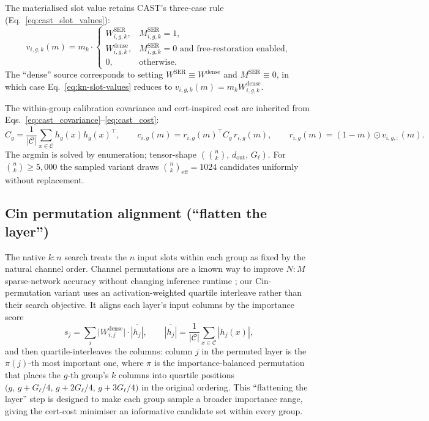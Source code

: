 \documentclass[11pt]{article}
\theoremstyle{plain}
\theoremstyle{definition}
\theoremstyle{remark}
\newcommand{\1}{\mathbf{1}}
\begin{document}
The materialised slot value retains CAST's three-case rule (Eq.~\ref{eq:cast_slot_values}):
\begin{equation}
\label{eq:kn-slot-values}
v_{i,g,k}(m) = m_k \cdot \begin{cases}
W^{\mathrm{SER}}_{i,g,k}, & M^{\mathrm{SER}}_{i,g,k} = 1, \\
W^{\mathrm{dense}}_{i,g,k}, & M^{\mathrm{SER}}_{i,g,k} = 0 \text{ and free-restoration enabled}, \\
0, & \text{otherwise}.
\end{cases}
\end{equation}
The ``dense'' source corresponds to setting $W^{\mathrm{SER}} \equiv W^{\mathrm{dense}}$ and $M^{\mathrm{SER}} \equiv 0$, in which case Eq.~\eqref{eq:kn-slot-values} reduces to $v_{i,g,k}(m) = m_k W^{\mathrm{dense}}_{i,g,k}$.

The within-group calibration covariance and cert-inspired cost are inherited from Eqs.~\ref{eq:cast_covariance}--\ref{eq:cast_cost}:
\begin{equation}
\label{eq:kn-cost}
C_g = \frac{1}{|\mathcal{C}|} \sum_{x \in \mathcal{C}} h_g(x) h_g(x)^\top,
\qquad
c_{i,g}(m) = r_{i,g}(m)^\top C_g\, r_{i,g}(m),
\qquad
r_{i,g}(m) = (1 - m) \odot v_{i,g,:}(m).
\end{equation}
The argmin is solved by enumeration; tensor-shape $(\binom{n}{k},\, d_{\mathrm{out}},\, G_\ell)$. For $\binom{n}{k}\ge 5{,}000$ the sampled variant draws $\binom{n}{k}_{\mathrm{eff}} = 1024$ candidates uniformly without replacement.

\subsection{Cin permutation alignment (``flatten the layer'')}
\label{subsec:perm}

The native $k{:}n$ search treats the $n$ input slots within each group as fixed by the natural channel order. Channel permutations are a known way to improve \(N{:}M\) sparse-network accuracy without changing inference runtime \citep{pool2021channel}; our Cin-permutation variant uses an activation-weighted quartile interleave rather than their search objective. It aligns each layer's input columns by the importance score
\[
s_j = \sum_i \bigl|W^{\mathrm{dense}}_{i,j}\bigr| \cdot \bar{|h_j|},
\qquad \bar{|h_j|} = \frac{1}{|\mathcal{C}|} \sum_{x \in \mathcal{C}} |h_{j}(x)|,
\]
and then quartile-interleaves the columns: column $j$ in the permuted layer is the $\pi(j)$-th most important one, where $\pi$ is the importance-balanced permutation that places the $g$-th group's $k$ columns into quartile positions $\bigl(g,\, g+G_\ell/4,\, g+2G_\ell/4,\, g+3G_\ell/4\bigr)$ in the original ordering. This ``flattening the layer'' step is designed to make each group sample a broader importance range, giving the cert-cost minimiser an informative candidate set within every group.
\end{document}
